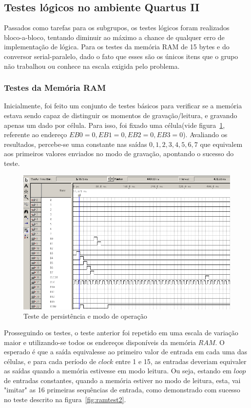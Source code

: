 \documentclass[12pt]{article}
\begin{document}
\subsection{Testes lógicos no ambiente Quartus II}

Passados como tarefas para os subgrupos, os testes lógicos foram realizados bloco-a-bloco, tentando diminuir ao máximo a chance de qualquer erro de implementação de lógica. Para os testes da memória RAM de 15 bytes e do conversor serial-paralelo, dado o fato que esses são os únicos itens que o grupo não trabalhou ou conhece na escala exigida pelo problema.

\subsubsection{Testes da Memória RAM}

Inicialmente, foi feito um conjunto de testes básicos para verificar se a memória estava sendo capaz de distinguir os momentos de gravação/leitura, e gravando apenas um dado por célula. Para isso, foi fixado uma célula(vide figura~\ref{fig:ramtest}, referente ao endereço $EB0=0, EB1=0, EB2=0, EB3=0$). Avaliando os resultados, percebe-se uma constante nas saídas $0,1,2,3,4,5,6,7$ que equivalem aos primeiros valores enviados no modo de gravação, apontando o sucesso do teste.

\begin{figure}[h]
\centering
\includegraphics[width=1\textwidth]{img/testram1.png}
\caption{Teste de persistência e modo de operação}
\label{fig:ramtest}
\end{figure}

Prosseguindo os testes, o teste anterior foi repetido em uma escala de variação maior e utilizando-se todos os endereços disponíveis da memória $RAM$. O esperado é que a saída equivalesse ao primeiro valor de entrada em cada uma das células, e para cada período de $clock$ entre 1 e 15, as entradas deveriam equivaler as saídas quando a memória estivesse em modo leitura. Ou seja, estando em $loop$ de entradas constantes, quando a memória estiver no modo de leitura, esta, vai "imitar" as 16 primeiras sequências de entrada, como demonstrado com sucesso no teste descrito na figura~\ref{fig:ramtest2}.
\end{document}
